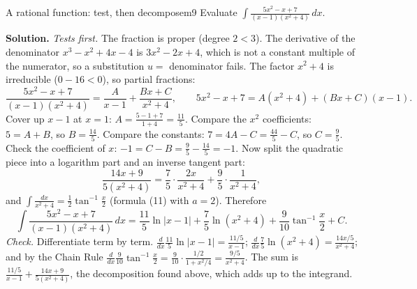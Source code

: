 \documentclass[11pt]{article}
\begin{document}
\begin{exmp}{A rational function: test, then decompose}{m9}
Evaluate $\displaystyle\int\frac{5x^2-x+7}{(x-1)(x^2+4)}\,dx$.

\textbf{Solution.} \emph{Tests first.} The fraction is proper (degree $2<3$). The derivative of the denominator $x^3-x^2+4x-4$ is $3x^2-2x+4$, which is not a constant multiple of the numerator, so a substitution $u=$ denominator fails. The factor $x^2+4$ is irreducible ($0-16<0$), so partial fractions:
\[\frac{5x^2-x+7}{(x-1)(x^2+4)}=\frac A{x-1}+\frac{Bx+C}{x^2+4},\qquad 5x^2-x+7=A(x^2+4)+(Bx+C)(x-1).\]
Cover up $x-1$ at $x=1$: $A=\frac{5-1+7}{1+4}=\frac{11}5$. Compare the $x^2$ coefficients: $5=A+B$, so $B=\frac{14}5$. Compare the constants: $7=4A-C=\frac{44}5-C$, so $C=\frac95$. Check the coefficient of $x$: $-1=C-B=\frac95-\frac{14}5=-1$. Now split the quadratic piece into a logarithm part and an inverse tangent part:
\[\frac{14x+9}{5(x^2+4)}=\frac75\cdot\frac{2x}{x^2+4}+\frac95\cdot\frac1{x^2+4},\]
and $\int\frac{dx}{x^2+4}=\frac12\tan^{-1}\frac x2$ (formula (11) with $a=2$). Therefore
\[\int\frac{5x^2-x+7}{(x-1)(x^2+4)}\,dx=\frac{11}5\ln\lvert x-1\rvert+\frac75\ln\left(x^2+4\right)+\frac9{10}\tan^{-1}\frac x2+C .\]
\emph{Check.} Differentiate term by term. $\frac d{dx}\frac{11}5\ln\lvert x-1\rvert=\frac{11/5}{x-1}$; $\frac d{dx}\frac75\ln(x^2+4)=\frac{14x/5}{x^2+4}$; and by the Chain Rule $\frac d{dx}\frac9{10}\tan^{-1}\frac x2=\frac9{10}\cdot\frac{1/2}{1+x^2/4}=\frac{9/5}{x^2+4}$. The sum is $\frac{11/5}{x-1}+\frac{14x+9}{5(x^2+4)}$, the decomposition found above, which adds up to the integrand.
\end{exmp}
\end{document}

